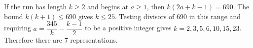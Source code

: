 If the run has length $k\ge2$ and begins at $a\ge1$, then $k(2a+k-1)=690$. The bound $k(k+1)\le690$ gives $k\le25$. Testing divisors of $690$ in this range and requiring $a=\dfrac{345}{k}-\dfrac{k-1}{2}$ to be a positive integer gives $k=2,3,5,6,10,15,23$. Therefore there are $\boxed7$ representations.
